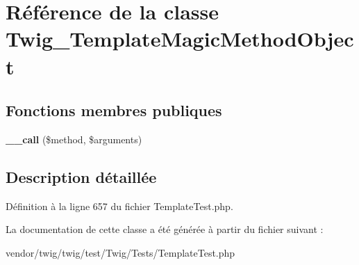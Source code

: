 \hypertarget{class_twig___template_magic_method_object}{}\section{Référence de la classe Twig\+\_\+\+Template\+Magic\+Method\+Object}
\label{class_twig___template_magic_method_object}
\subsection*{Fonctions membres publiques}
\begin{DoxyCompactItemize}
\item 
{\bfseries \+\_\+\+\_\+call} (\$method, \$arguments)\hypertarget{class_twig___template_magic_method_object_acfa40ec504c3c792c3b84cf2f1af511d}{}\label{class_twig___template_magic_method_object_acfa40ec504c3c792c3b84cf2f1af511d}

\end{DoxyCompactItemize}


\subsection{Description détaillée}


Définition à la ligne 657 du fichier Template\+Test.\+php.



La documentation de cette classe a été générée à partir du fichier suivant \+:\begin{DoxyCompactItemize}
\item 
vendor/twig/twig/test/\+Twig/\+Tests/Template\+Test.\+php\end{DoxyCompactItemize}
